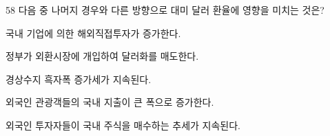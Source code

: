 \begin{question}{58}
다음 중 나머지 경우와 다른 방향으로 대미 달러 환율에 영향을 미치는 것은?
\begin{choices}
  \item 국내 기업에 의한 해외직접투자가 증가한다.
  \item 정부가 외환시장에 개입하여 달러화를 매도한다.
  \item 경상수지 흑자폭 증가세가 지속된다.
  \item 외국인 관광객들의 국내 지출이 큰 폭으로 증가한다.
  \item 외국인 투자자들이 국내 주식을 매수하는 추세가 지속된다.
\end{choices}
\end{question}
